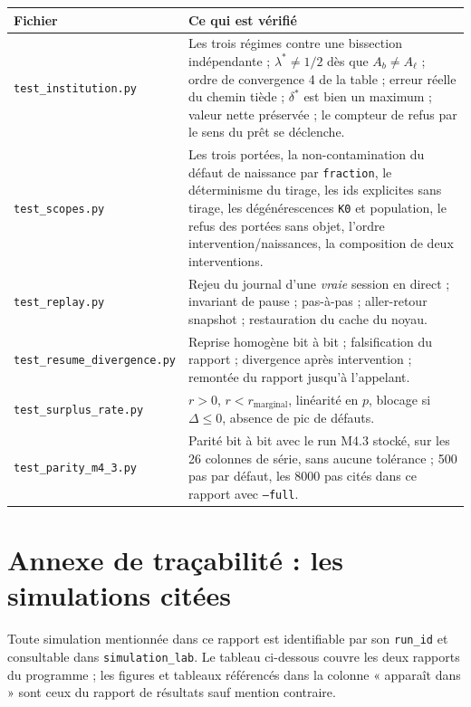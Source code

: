 \documentclass[11pt,a4paper]{article}
\newcommand{\code}[1]{\texttt{#1}}
\begin{document}
\begin{longtable}{@{}p{4.5cm}p{11.5cm}@{}}
\toprule
\textbf{Fichier} & \textbf{Ce qui est vérifié} \\
\midrule
\endhead
\code{test\_institution.py} & Les trois régimes contre une bissection
indépendante ; $\lambda^{*}\ne1/2$ dès que $A_b\ne A_\ell$ ; ordre de
convergence 4 de la table ; erreur réelle du chemin tiède ; $\delta^{*}$
est bien un maximum ; valeur nette préservée ; le compteur de refus par le
sens du prêt se déclenche. \\
\code{test\_scopes.py} & Les trois portées, la non-contamination du défaut
de naissance par \code{fraction}, le déterminisme du tirage, les ids
explicites sans tirage, les dégénérescences \code{K0} et population,
le refus des portées sans objet, l'ordre intervention/naissances, la
composition de deux interventions. \\
\code{test\_replay.py} & Rejeu du journal d'une \emph{vraie} session en
direct ; invariant de pause ; pas-à-pas ; aller-retour snapshot ;
restauration du cache du noyau. \\
\code{test\_resume\_divergence.py} & Reprise homogène bit à bit ;
falsification du rapport ; divergence après intervention ; remontée du
rapport jusqu'à l'appelant. \\
\code{test\_surplus\_rate.py} & $r>0$, $r<r_{\text{marginal}}$, linéarité
en $p$, blocage si $\Delta\le0$, absence de pic de défauts. \\
\code{test\_parity\_m4\_3.py} & Parité bit à bit avec le run M4.3 stocké,
sur les 26 colonnes de série, sans aucune tolérance ; 500 pas par défaut,
les 8000 pas cités dans ce rapport avec \code{--full}. \\
\bottomrule
\end{longtable}

\appendix
\section{Annexe de traçabilité : les simulations citées}

Toute simulation mentionnée dans ce rapport est identifiable par son
\code{run\_id} et consultable dans \code{simulation\_lab}. Le tableau
ci-dessous couvre les deux rapports du programme ; les figures et tableaux
référencés dans la colonne « apparaît dans » sont ceux du rapport de
résultats sauf mention contraire.


\end{document}
